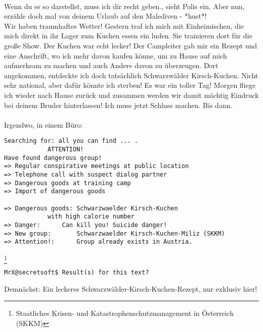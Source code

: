 \\
\glqq Wenn du es so darstellst, muss ich dir recht geben.\grqq, sieht Polis ein. \glqq Aber nun, erzähle doch mal von deinem Urlaub auf den Malediven - *hust*!\grqq
\\
\glqq Wir haben traumhaftes Wetter! Gestern traf ich mich mit Einheimischen, die mich direkt in ihr Lager zum Kuchen essen ein luden. Sie trainieren dort für die große Show. Der Kuchen war echt lecker! Der Campleiter gab mir ein Rezept und eine Anschrift, wo ich mehr davon kaufen könne, um zu Hause auf mich aufmerksam zu machen und auch Andere davon zu überzeugen. Dort angekommen, entdeckte ich doch tatsächlich Schwarzwälder Kirsch-Kuchen. Nicht sehr national, aber dafür könnte ich sterben! Es war ein toller Tag! Morgen fliege ich wieder nach Hause zurück und zusammen werden wir damit mächtig Eindruck bei deinem Bruder hinterlassen! Ich muss jetzt Schluss machen. Bis dann.\grqq
\\
\\
Irgendwo, in einem Büro:

\begin{lstlisting}[frame=single]
Searching for: all you can find ... .
			ATTENTION!
Have found dangerous group!
=> Regular conspirative meetings at public location
=> Telephone call with suspect dialog partner 
=> Dangerous goods at training camp
=> Import of dangerous goods

=> Dangerous goods: Schwarzwaelder Kirsch-Kuchen 
		    with high calorie number
=> Danger: 	    Can kill you! Suicide danger!
=> New group:       Schwarzwaelder Kirsch-Kuchen-Miliz (SKKM)
=> Attention!: 	    Group already exists in Austria.
\end{lstlisting}\footnote{Staatliches Krisen- und Katastrophenschutzmanagement in Österreich (SKKM)}

\begin{lstlisting}[frame=single]
MrX@secretsoft$ Result(s) for this text?
\end{lstlisting}

Demnächst: Ein leckeres Schwarzwälder-Kirsch-Kuchen-Rezept, nur exklusiv hier!

